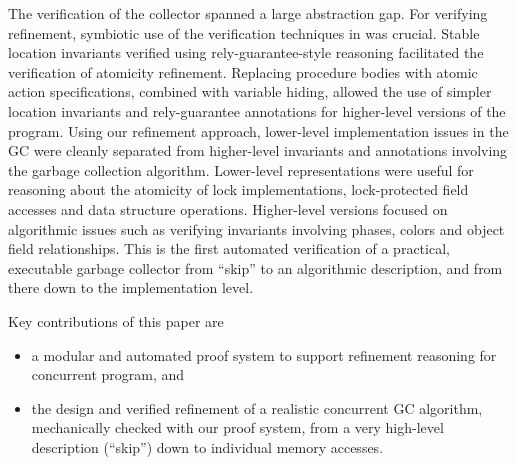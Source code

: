 The verification of the collector spanned a large abstraction gap. For verifying refinement, symbiotic use of the verification techniques in \civl was crucial. Stable location invariants verified using rely-guarantee-style reasoning facilitated the verification of atomicity refinement. Replacing procedure bodies with atomic action specifications, combined with variable hiding, allowed the use of simpler location invariants and rely-guarantee annotations for higher-level versions of the program.
Using our refinement approach, lower-level implementation issues in the GC were cleanly separated from higher-level invariants and annotations involving the garbage collection algorithm. Lower-level representations were useful for reasoning about the atomicity of lock implementations, lock-protected field accesses and data structure operations. Higher-level versions focused on algorithmic issues such as verifying invariants involving phases, colors and object field relationships. This is the first automated verification of a practical, executable garbage collector from ``skip'' to an algorithmic description, and from there down to the implementation level.

Key contributions of this paper are 
\begin{itemize}
\item a modular and automated proof system to support refinement reasoning for concurrent program, and 
\item the design and verified refinement of a realistic concurrent GC algorithm, mechanically checked with our proof system, from a very high-level description (``skip'') down to individual memory accesses.
\end{itemize}




